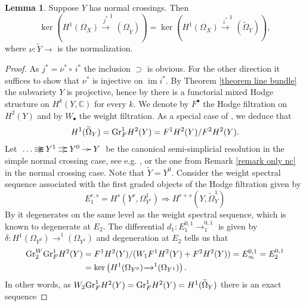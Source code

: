 \documentclass[a4paper,11pt,final]{amsart}
\theoremstyle{plain}
\theoremstyle{definition}
\newtheorem{lemma}[subsection]{Lemma}
\numberwithin{equation}{section}
\theoremstyle{remark}
\begin{document}
\begin{lemma}\label{lemma weight argument}
Suppose $Y$ has normal crossings. Then $$\ker\left(H^1(\Omega_X) {\xrightarrow{\ j^*\ }}^1(\Omega_{{\widetilde{Y}}})\right) = \ker\left(H^1(\Omega_X) {\xrightarrow{\ i^*\ }}^1({\widetilde{\Omega}}_Y)\right),$$
where $\nu:{{\widetilde{Y}}}{\xrightarrow{\ \ }}$ is the normalization.
\end{lemma}
\begin{proof}
As $j^* = \nu^* \circ \, i^*$ the inclusion $\supset$ is obvious. For the other direction it suffices to show that $\nu^*$ is injective on ${\operatorname{im}} i^*$. By Theorem \ref{theorem line bundle} the subvariety $Y$ is projective, hence by \cite{De71,De74} there is a functorial mixed Hodge structure on $H^k(Y,{{\mathbb C}})$ for every $k$. We denote by $F^\bullet$ the Hodge filtration on $H^2(Y)$ and by $W_\bullet$ the weight filtration. As a special case of \cite[Cor 4.16]{CL12}, we deduce that 
\[
H^1({\widetilde{\Omega}}_Y)= {{\rm Gr}}_F^1 H^2(Y) = F^1H^2(Y) / F^2H^2(Y).
\]
Let $\begin{xy}
\xymatrix@C=1em{
\ldots  \ar[r]\ar@<0.5ex>[r]\ar@<-0.5ex>[r] & Y^{1} \ar@<0.5ex>[r]\ar@<-0.5ex>[r] & Y^{0} \ar[r]& Y \\
}
\end{xy}$ be the canonical semi-simplicial resolution in the simple normal crossing case, see e.g. \cite[4.8]{CL12}, or the one from Remark \ref{remark only nc} in the normal crossing case. Note that ${{\widetilde{Y}}}=Y^{0}$. Consider the weight spectral sequence associated with the first graded objects of the Hodge filtration given by
\begin{equation}\label{gr spec seq}
E_1^{r,s}= H^s(Y^{r}, \Omega_{Y^{r}}^1) \Rightarrow H^{r+s}(Y,{\widetilde{\Omega}}^1_Y)
\end{equation}
By \cite[Thm 3.12 (3)]{PS} it degenerates on the same level as the weight spectral sequence, which is known to degenerate at $E_2$. The differential $d_1:E_1^{0,1} {\xrightarrow{\ \ }}_1^{0,1}$ is given by $\delta:H^1(\Omega_{Y^{0}}){\xrightarrow{\ \ }}^1(\Omega_{Y^{1}})$ and degeneration at $E_2$ tells us that
\begin{align*}
{{\rm Gr}}_2^W{{\rm Gr}}_F^1 H^2(Y) &= F^1 H^2(Y)/(W_1F^1H^2(Y) + F^2 H^2(Y)) = E_\infty^{0,1} = E_2^{0,1}\\&= \ker\left(H^1(\Omega_{Y^{0}}){\xrightarrow{\ \ }}^1(\Omega_{Y^{1}})\right).
\end{align*}
In other words, as $W_2 {{\rm Gr}}_F^1 H^2(Y) = {{\rm Gr}}_F^1 H^2(Y) = H^1({\widetilde{\Omega}}_Y)$ there is an exact sequence

\end{proof}
\end{document}
